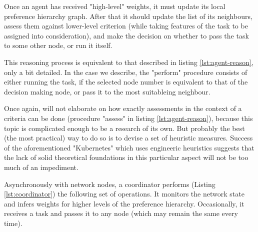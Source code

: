 Once an agent has received "high-level" weights, it must update its local preference hierarchy graph.
After that it should update the list of its neighbours, assess them against lower-level criterion (while taking features of the task to be assigned into consideration), and make the decision on whether to pass the task to some other node, or run it itself.

This reasoning process is equivalent to that described in listing \ref{lst:agent-reason}, only a bit detailed.
In the case we describe, the "perform" procedure consists of either running the task, if the selected node number is equivalent to that of the decision making node, or pass it to the most suitableing neighbour.

Once again, will not elaborate on how exactly assessments in the context of a criteria can be done (procedure "assess" in listing \ref{lst:agent-reason}), because this topic is complicated enough to be a research of its own.
But probably the best (the most practical) way to do so is to devise a set of heuristic measures.
Success of the aforementioned "Kubernetes" which uses engineeric heuristics suggests that the lack of solid theoretical foundations in this particular aspect will not be too much of an impediment.

Asynchronously with network nodes, a coordinator performs (Listing \ref{lst:coordinator}) the following set of operations.
It monitors the network state and infers weights for higher levels of the preference hierarchy.
Occasionally, it receives a task and passes it to any node (which may remain the same every time).
